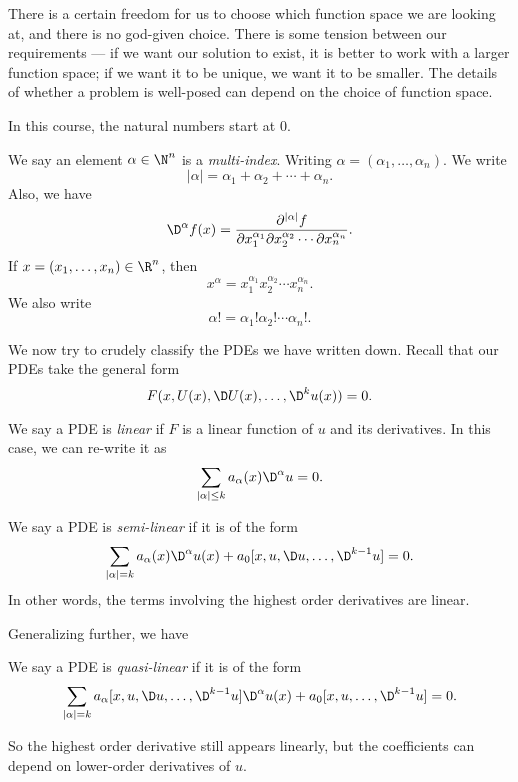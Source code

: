 \documentclass[a4paper]{article}
\begin{document}
There is a certain freedom for us to choose which function space we are looking at, and there is no god-given choice. There is some tension between our requirements --- if we want our solution to exist, it is better to work with a larger function space; if we want it to be unique, we want it to be smaller. The details of whether a problem is well-posed can depend on the choice of function space.

In this course, the natural numbers start at $0$.
\begin{notation}
  We say an element $\alpha \in \N^n$ is a \emph{multi-index}. Writing $\alpha = (\alpha_1, \ldots, \alpha_n)$. We write
  \[
    |\alpha| = \alpha_1 + \alpha_2 + \cdots + \alpha_n.
  \]
  Also, we have
  \[
    \D^\alpha f(x) = \frac{\partial^{|\alpha|}f}{\partial x_1^{\alpha_1} \partial x_2^{\alpha_2} \cdots \partial x_n^{\alpha_n}}.
  \]
  If $x = (x_1, \ldots, x_n) \in \R^n$, then
  \[
    x^\alpha = x_1^{\alpha_1} x_2^{\alpha_2} \cdots x_n^{\alpha_n}.
  \]
  We also write
  \[
    \alpha! = \alpha_1! \alpha_2! \cdots \alpha_n!.
  \]
\end{notation}

We now try to crudely classify the PDEs we have written down. Recall that our PDEs take the general form
\[
  F(x, U(x), \D U(x), \ldots, \D^k u(x)) = 0.
\]

\begin{defi}
  We say a PDE is \emph{linear} if $F$ is a linear function of $u$ and its derivatives. In this case, we can re-write it as
  \[
    \sum_{|\alpha| \leq k} a_\alpha(x) \D^\alpha u = 0.
  \]
\end{defi}

\begin{defi}
  We say a PDE is \emph{semi-linear} if it is of the form
  \[
    \sum_{|\alpha| = k} a_\alpha(x) \D^\alpha u(x) + a_0[x, u, \D u, \ldots, \D^{k - 1} u] = 0.
  \]
  In other words, the terms involving the highest order derivatives are linear.
\end{defi}
Generalizing further, we have
\begin{defi}
  We say a PDE is \emph{quasi-linear} if it is of the form
  \[
    \sum_{|\alpha| = k} a_\alpha [x, u, \D u, \ldots, \D^{k - 1} u] \D^\alpha u(x) + a_0[x, u, \ldots, \D^{k - 1} u] = 0.
  \]
\end{defi}
So the highest order derivative still appears linearly, but the coefficients can depend on lower-order derivatives of $u$.
\end{document}
